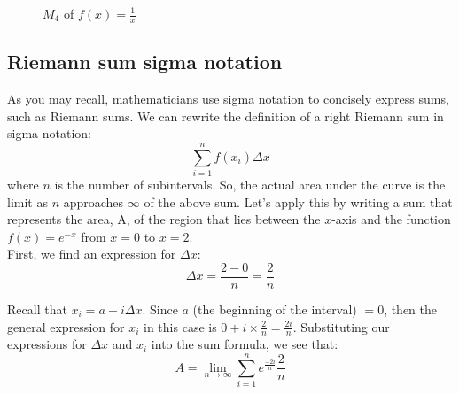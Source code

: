 \begin{figure}
    \centering
    \caption{$M_4$ of $f(x)=\frac{1}{x}$}
    \label{fig:midriemann}
\end{figure}

\subsection{Riemann sum sigma notation}
As you may recall, mathematicians use sigma notation to concisely express sums, such as Riemann sums. We can rewrite the definition of a right Riemann sum in sigma notation:\\
$$\sum_{i=1}^{n}f(x_{i})\Delta x$$ where $n$ is the number of subintervals. So, the actual area under the curve is the limit as $n$ approaches $\infty$ of the above sum. Let's apply this by writing a sum that represents the area, A, of the region that lies between the $x$-axis and the function $f(x) = e^{-x}$ from $x=0$ to $x=2$. \\

First, we find an expression for $\Delta x$:\\
$$\Delta x = \frac{2-0}{n}=\frac{2}{n}$$

Recall that $x_i = a+i\Delta x$. Since $a$ (the beginning of the interval) $=0$, then the general expression for $x_i$ in this case is $0+i\times\frac{2}{n}=\frac{2i}{n}$. Substituting our expressions for $\Delta x$ and $x_i$ into the sum formula, we see that:\\
$$A=\lim_{n\to\infty}\sum_{i=1}^{n}e^{\frac{-2i}{n}}\frac{2}{n}$$


